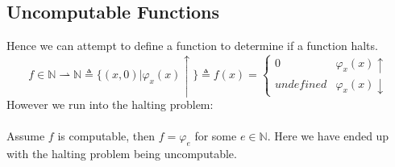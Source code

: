 \documentclass{report}
\begin{document}
        \subsection*{Uncomputable Functions}
            Hence we can attempt to define a function to determine if a function halts.
            \[f \in \mathbb{N} \rightharpoonup \mathbb{N} \triangleq \{(x,0) | \varphi_x(x)\uparrow\} \triangleq f(x) = \begin{cases}
                0 & \varphi_x(x)\uparrow \\
                undefined & \varphi_x(x)\downarrow
            \end{cases}\]
            However we run into the halting problem:
            \\
            \\ Assume $f$ is computable, then $f = \varphi_e$ for some $e \in \mathbb{N}$.
            Here we have ended up with the halting problem being uncomputable.
        
\end{document}
